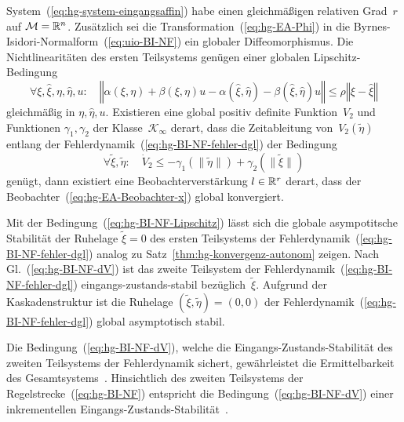 \begin{theorem}
\label{thm:hg-konvergenz-BI-BF}System~(\ref{eq:hg-system-eingangsaffin})
habe einen gleichmäßigen relativen Grad~$r$ auf $\mathcal{M}={\mathbb{R}}^{n}$.
Zusätzlich sei die Transformation~(\ref{eq:hg-EA-Phi}) in die Byrnes-Isidori-Normalform~(\ref{eq:uio-BI-NF})
ein globaler Diffeomorphismus. Die Nichtlinearitäten des ersten Teilsystems
genügen einer globalen Lipschitz-Bedingung
\begin{equation}
\forall\xi,\hat{\xi},\eta,\hat{\eta},u:\quad\left\Vert \alpha(\xi,\eta)+\beta(\xi,\eta)u-\alpha(\hat{\xi},\hat{\eta})-\beta(\hat{\xi},\hat{\eta})u\right\Vert \leq\rho\left\Vert \xi-\hat{\xi}\right\Vert \label{eq:hg-BI-NF-Lipschitz}
\end{equation}
gleichmäßig in $\eta,\hat{\eta},u$. Existieren eine global positiv
definite Funktion~$V_{2}$ und Funktionen $\gamma_{1},\gamma_{2}$
der Klasse~$\mathcal{K}_{\infty}$ derart, dass die Zeit\-ableitung
von~$V_{2}(\tilde{\eta})$ entlang der Fehlerdynamik~(\ref{eq:hg-BI-NF-fehler-dgl})
der Bedingung 
\begin{equation}
\forall\tilde{\xi},\tilde{\eta}:\quad\dot{V}_{2}\leq-\gamma_{1}(\|\tilde{\eta}\|)+\gamma_{2}(\|\tilde{\xi}\|)\label{eq:hg-BI-NF-dV}
\end{equation}
genügt, dann existiert eine Beobachterverstärkung $l\in{\mathbb{R}}^{r}$ derart,
dass der Beobachter~(\ref{eq:hg-EA-Beobachter-x}) global konvergiert.
\end{theorem}
\begin{proofsketch}Mit der Bedingung~(\ref{eq:hg-BI-NF-Lipschitz})
lässt sich die globale asympotitsche Stabilität der Ruhelage $\tilde{\xi}=0$
des ersten Teilsystems der Fehler\-dynamik~(\ref{eq:hg-BI-NF-fehler-dgl})
analog zu Satz~\ref{thm:hg-konvergenz-autonom} zeigen. Nach Gl.~(\ref{eq:hg-BI-NF-dV})
ist das zweite Teilsystem der Fehlerdynamik~(\ref{eq:hg-BI-NF-fehler-dgl})
eingangs-zustands-stabil bezüglich~$\tilde{\xi}$. Aufgrund der Kaskaden\-struktur
ist die Ruhelage $(\tilde{\xi},\tilde{\eta})=(0,0)$ der Fehlerdynamik~(\ref{eq:hg-BI-NF-fehler-dgl})
global asymptotisch stabil.\end{proofsketch}

Die Bedingung~(\ref{eq:hg-BI-NF-dV}), welche die Eingangs-Zustands-Stabilität
des zweiten Teilsystems der Fehlerdynamik sichert, gewährleistet die
Ermittelbarkeit des Gesamtsystems~\cite{amicucci1998,sontag97oss}.
Hinsichtlich des zweiten Teilsystems der Regelstrecke~(\ref{eq:hg-BI-NF})
entspricht die Bedingung~(\ref{eq:hg-BI-NF-dV}) einer inkrementellen
Eingangs-Zustands-Stabilität~\cite{Angeli2002}.

